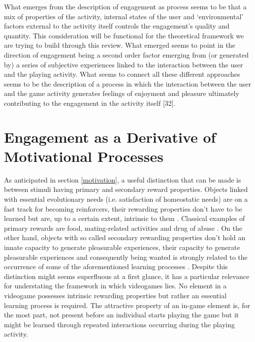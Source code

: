 What emerges from the description of engagement as process seems to be that a mix of properties of the activity, internal states of the user and ‘environmental’ factors external to the activity itself controls the engagement’s quality and quantity. This consideration will be functional for the theoretical framework we are trying to build through this review. What emerged seems to point in the direction of engagement being a second order factor emerging from (or generated by) a series of subjective experiences linked to the interaction between the user and the playing activity. What seems to connect all these different approaches seems to be the description of a process in which the interaction between the user and the game activity generates feelings of enjoyment and pleasure ultimately contributing to the engagement in the activity itself [32].

\section{Engagement as a Derivative of Motivational Processes}

As anticipated in section \ref{motivation}, a useful distinction that can be made is between stimuli having primary and secondary reward properties. Objects linked with essential evolutionary needs (i.e. satisfaction of homeostatic needs) are on a fast track for becoming reinforcers, their rewarding properties don’t have to be learned but are, up to a certain extent, intrinsic to them \cite{sescousse2013processing}. Classical examples of primary rewards are food, mating-related activities and drug of abuse \cite{berridge2004motivation, simpson2016behavioral}. On the other hand, objects with so called secondary rewarding properties don’t hold an innate capacity to generate pleasurable experiences, their capacity to generate pleasurable experiences and consequently being wanted is strongly related to the occurrence of some of the aforementioned learning processes \cite{sescousse2013processing}. Despite this distinction might seems superfluous at a first glance, it has a particular relevance for understating the framework in which videogames lies. No element in a videogame possesses intrinsic rewarding properties but rather an essential learning process is required. The attractive property of an in-game element is, for the most part, not present before an individual starts playing the game but it might be learned through repeated interactions occurring during the playing activity.

